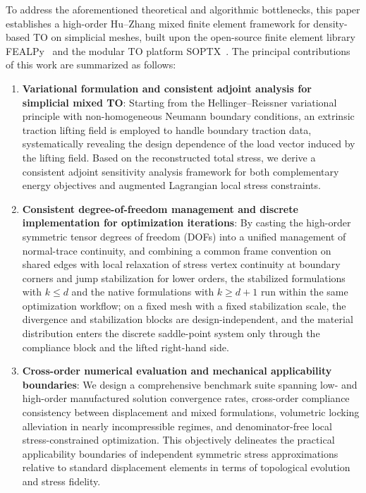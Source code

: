 To address the aforementioned theoretical and algorithmic bottlenecks, this paper establishes a high-order Hu--Zhang mixed finite element framework for density-based TO on simplicial meshes, built upon the open-source finite element library FEALPy~\cite{Zheng2026FEALPy} and the modular TO platform SOPTX~\cite{He2026SOPTX}. The principal contributions of this work are summarized as follows:
\begin{enumerate}
    \item \textbf{Variational formulation and consistent adjoint analysis for simplicial mixed TO}: Starting from the Hellinger--Reissner variational principle with non-homogeneous Neumann boundary conditions, an extrinsic traction lifting field is employed to handle boundary traction data, systematically revealing the design dependence of the load vector induced by the lifting field. Based on the reconstructed total stress, we derive a consistent adjoint sensitivity analysis framework for both complementary energy objectives and augmented Lagrangian local stress constraints.
    \item \textbf{Consistent degree-of-freedom management and discrete implementation for optimization iterations}: By casting the high-order symmetric tensor degrees of freedom (DOFs) into a unified management of normal-trace continuity, and combining a common frame convention on shared edges with local relaxation of stress vertex continuity at boundary corners and jump stabilization for lower orders, the stabilized formulations with $k\le d$ and the native formulations with $k\ge d+1$ run within the same optimization workflow; on a fixed mesh with a fixed stabilization scale, the divergence and stabilization blocks are design-independent, and the material distribution enters the discrete saddle-point system only through the compliance block and the lifted right-hand side.
    \item \textbf{Cross-order numerical evaluation and mechanical applicability boundaries}: We design a comprehensive benchmark suite spanning low- and high-order manufactured solution convergence rates, cross-order compliance consistency between displacement and mixed formulations, volumetric locking alleviation in nearly incompressible regimes, and denominator-free local stress-constrained optimization. This objectively delineates the practical applicability boundaries of independent symmetric stress approximations relative to standard displacement elements in terms of topological evolution and stress fidelity.
\end{enumerate}

